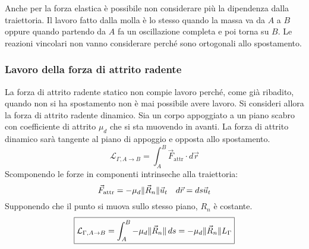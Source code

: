 \documentclass[10pt,a4paper]{book}
\DeclarePairedDelimiter{\norma}{\lVert}{\rVert} %
\begin{document}
\FloatBarrier
Anche per la forza elastica è possibile non considerare più la dipendenza dalla traiettoria. Il lavoro fatto dalla molla è lo stesso quando la massa va da $A$ a $B$ oppure quando partendo da $A$ fa un oscillazione completa
e poi torna su $B$. Le reazioni vincolari non vanno considerare perché sono ortogonali allo spostamento.

\subsubsection{Lavoro della forza di attrito radente}

La forza di attrito radente statico non compie lavoro perché, come già ribadito, quando non si ha spostamento non è mai possibile avere lavoro. Si consideri allora la forza di attrito radente dinamico. Sia un corpo appoggiato a un piano scabro con coefficiente di attrito $\mu_d$ che si sta muovendo in avanti. La forza di attrito dinamico sarà tangente al piano di appoggio e opposta allo spostamento.
\[
	\mathcal{L}_{\Gamma, A \to B}=\int_A^B \vec{F}_{\text{attr}} \cdot d\vec{r}
\]
Scomponendo le forze in componenti intrinseche alla traiettoria:
\[
	\vec{F}_{\text{attr}}=-\mu_d\norma{\vec{R}_n} \vec{u}_t \quad d\vec{r}=ds\vec{u}_t
\]
Supponendo che il punto si muova sullo stesso piano, $R_n$ è costante.
\[
	\boxed{\mathcal{L}_{\Gamma, A \to B}=\int_A^B -\mu_d\norma{\vec{R}_n} \,ds=-\mu_d\norma{\vec{R}_n}L_\Gamma}
\]
\end{document}

